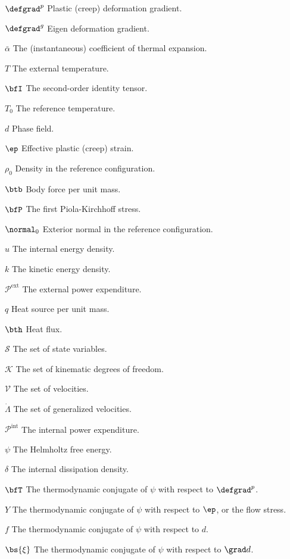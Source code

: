 \begin{symbollist}
  \item[$\defgrad^p$] Plastic (creep) deformation gradient.
  \item[$\defgrad^g$] Eigen deformation gradient.
  \item[$\bar{\alpha}$] The (instantaneous) coefficient of thermal expansion.
  \item[$T$] The external temperature.
  \item[$\bfI$] The second-order identity tensor.
  \item[$T_0$] The reference temperature.
  \item[$d$] Phase field.
  \item[$\ep$] Effective plastic (creep) strain.
  \item[$\rho_0$] Density in the reference configuration.
  \item[$\btb$] Body force per unit mass.
  \item[$\bfP$] The first Piola-Kirchhoff stress.
  \item[$\normal_0$] Exterior normal in the reference configuration.
  \item[$u$] The internal energy density.
  \item[$k$] The kinetic energy density.
  \item[$\mathcal{P}^\text{ext}$] The external power expenditure.
  \item[$q$] Heat source per unit mass.
  \item[$\bth$] Heat flux.
  \item[$\mathcal{S}$] The set of state variables.
  \item[$\mathcal{K}$] The set of kinematic degrees of freedom.
  \item[$\mathcal{V}$] The set of velocities.
  \item[$\mathcal{\dot{\Lambda}}$] The set of generalized velocities.
  \item[$\mathcal{P}^\text{int}$] The internal power expenditure.
  \item[$\psi$] The Helmholtz free energy.
  \item[$\delta$] The internal dissipation density.
  \item[$\bfT$] The thermodynamic conjugate of $\psi$ with respect to $\defgrad^p$.
  \item[$Y$] The thermodynamic conjugate of $\psi$ with respect to $\ep$, or the flow stress.
  \item[$f$] The thermodynamic conjugate of $\psi$ with respect to $d$.
  \item[$\bs{\xi}$] The thermodynamic conjugate of $\psi$ with respect to $\grad d$.

\end{symbollist}
